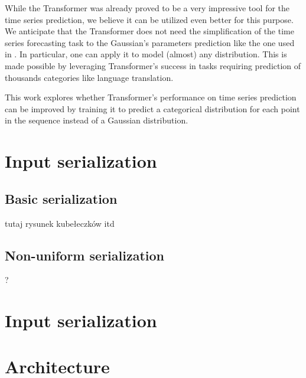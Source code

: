 \documentclass[en]{pracamgr}
\begin{document}




While the Transformer was already proved to be a very impressive tool for the time series prediction, we believe it can be utilized even better for this purpose. We anticipate that the Transformer does not need the simplification of the time series forecasting task to the Gaussian's parameters prediction like the one used in \cite{enhancing}. In particular, one can apply it to model (almost) any distribution. This is made possible by leveraging Transformer's success in tasks requiring prediction of thousands categories like language translation.

This work explores whether Transformer's performance on time series prediction can be improved by training it to predict a categorical distribution for each point in the sequence instead of a Gaussian distribution.

\section{Input serialization}

\subsection{Basic serialization}
tutaj rysunek kubełeczków itd

\subsection{Non-uniform serialization}
?

\section{Input serialization}

\section{Architecture}
\end{document}
